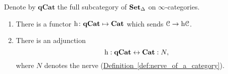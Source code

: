 \documentclass[main.tex]{subfiles}
\begin{document}
\begin{theorem}
  Denote by $\mathbf{qCat}$ the full subcategory of $\operatorname{\mathbf{Set}_{\Delta}}$ on $\infty$-categories.
  \begin{enumerate}
    \item There is a functor $\mathrm{h}\colon \mathbf{qCat} \mapsto \mathbf{Cat}$ which sends $\mathcal{C} \to \mathrm{h} \mathcal{C}$.

    \item There is an adjunction
      \begin{equation*}
        \mathrm{h} : \mathbf{qCat} \leftrightarrow \mathbf{Cat} : N,
      \end{equation*}
      where $N$ denotes the nerve (\hyperref[def:nerve_of_a_category]{Definition~\ref*{def:nerve_of_a_category}}).
  \end{enumerate}
\end{theorem}
\end{document}
